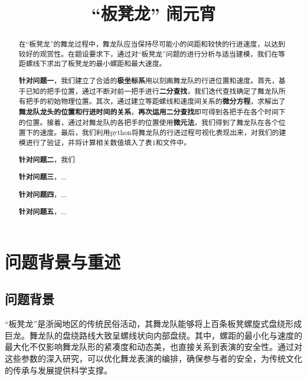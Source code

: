 \documentclass[a4paper]{article}
\title{“板凳龙” 闹元宵}
\date{} %
\begin{document}
	\maketitle
	\vspace{-6em} %
	\begin{abstract}
		在“板凳龙”的舞龙过程中，舞龙队应当保持尽可能小的间距和较快的行进速度，以达到较好的观赏性。在题设要求下，通过对“板凳龙”问题的进行分析与适当建模，我们在等距螺线下求出了板凳龙的最小螺距和最大速度。
		
		\hspace{0.2em}\textbf{针对问题一}，我们建立了合适的\textbf{极坐标系}用以刻画舞龙队的行进位置和速度。首先，基于已知的把手位置，通过不断对前一把手进行\textbf{二分查找}，我们迭代查找确定了舞龙队所有把手的初始物理位置。其次，通过建立等距螺线和速度间关系的\textbf{微分方程}，求解出了\textbf{舞龙队龙头的位置和行进时间的关系}，\textbf{再次运用二分查找}即可得到各把手在各个时间下的位置。接着，通过对舞龙队的各把手的位置使用\textbf{微元法}，我们得到了舞龙队在各个位置下的速度。最后，我们利用python将舞龙队的行进过程可视化表现出来，对我们的建模进行了验证，并将计算相关数值填入了表1和文件中。
		
		\textbf{针对问题二}，我们
		
		\textbf{针对问题三}，...
		
		\textbf{针对问题四}，...
		
		\textbf{针对问题五}，...\\
		\newline
	\end{abstract}
	
	\clearpage %
	
	\section{问题背景与重述}
	\subsection{问题背景}
	“板凳龙”是浙闽地区的传统民俗活动，其舞龙队能够将上百条板凳螺旋式盘绕形成巨龙。舞龙队的盘绕路线大致呈螺线状向内部盘绕。其中，螺距的最小化与速度的最大化不仅影响舞龙队形的紧凑度和动态美，也直接关系到表演的安全性。通过对这些参数的深入研究，可以优化舞龙表演的编排，确保参与者的安全，为传统文化的传承与发展提供科学支撑。
	
\end{document}
